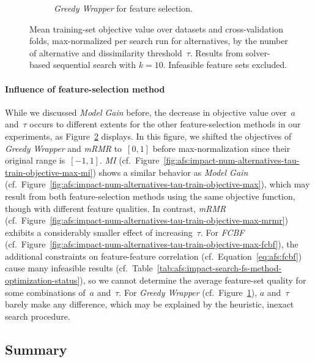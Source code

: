 \documentclass{article}
\theoremstyle{definition}
\begin{document}
\begin{figure}[t]
\begin{subfigure}[t]{0.48\textwidth}
		\caption{
			\emph{Greedy Wrapper} for feature selection.
		}
		\label{fig:afs:impact-num-alternatives-tau-train-objective-max-greedy-wrapper}
	\end{subfigure}
	\caption{
		Mean training-set objective value over datasets and cross-validation folds, max-normalized per search run for alternatives, by the number of alternative and dissimilarity threshold~$\tau$.
		Results from solver-based sequential search with $k=10$.
		Infeasible feature sets excluded.
	}
	\label{fig:afs:impact-num-alternatives-tau-train-objective-fs-method}
\end{figure}

\paragraph{Influence of feature-selection method}

While we discussed \emph{Model Gain} before, the decrease in objective value over~$a$ and~$\tau$ occurs to different extents for the other feature-selection methods in our experiments, as Figure~\ref{fig:afs:impact-num-alternatives-tau-train-objective-fs-method} displays.
In this figure, we shifted the objectives of \emph{Greedy Wrapper} and \emph{mRMR} to~$[0, 1]$ before max-normalization since their original range is~$[-1,1]$.
\emph{MI} (cf.~Figure~\ref{fig:afs:impact-num-alternatives-tau-train-objective-max-mi}) shows a similar behavior as \emph{Model Gain} (cf.~Figure~\ref{fig:afs:impact-num-alternatives-tau-train-objective-max}), which may result from both feature-selection methods using the same objective function, though with different feature qualities.
In contrast, \emph{mRMR} (cf.~Figure~\ref{fig:afs:impact-num-alternatives-tau-train-objective-max-mrmr}) exhibits a considerably smaller effect of increasing~$\tau$.
For \emph{FCBF} (cf.~Figure~\ref{fig:afs:impact-num-alternatives-tau-train-objective-max-fcbf}), the additional constraints on feature-feature correlation (cf.~Equation~\ref{eq:afs:fcbf}) cause many infeasible results (cf.~Table~\ref{tab:afs:impact-search-fs-method-optimization-status}), so we cannot determine the average feature-set quality for some combinations of~$a$ and~$\tau$.
For \emph{Greedy Wrapper} (cf.~Figure~\ref{fig:afs:impact-num-alternatives-tau-train-objective-max-greedy-wrapper}), $a$ and~$\tau$ barely make any difference, which may be explained by the heuristic, inexact search procedure.

\subsection{Summary}
\label{sec:afs:evaluation:summary}
\end{document}
